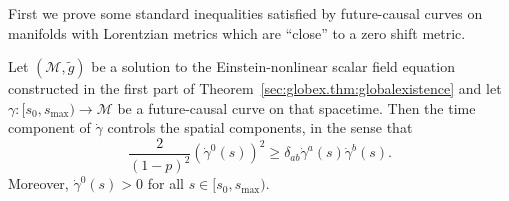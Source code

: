 \documentclass{article}
\newcommand{\mc}{\mathcal}
\newcommand{\wt}{\widetilde}
\newcommand{\ra}{\rightarrow}
\begin{document}
First we prove some standard inequalities satisfied by future-causal curves on manifolds with Lorentzian metrics which are ``close'' to a zero shift metric.
\begin{lemma}\label{sec:completethm.lem:causalbounds}
    Let $(\mc{M},\wt{g})$ be a solution to the Einstein-nonlinear scalar field equation constructed in the first part of Theorem~\ref{sec:globex.thm:globalexistence} and let $\gamma:[s_0,s_{\max}) \ra \mc{M}$ be a future-causal curve on that spacetime. Then the time component of $\dot{\gamma}$ controls the spatial components, in the sense that
    \begin{equation}\label{sec:completethm.eq:causalbounds}
        \frac{2}{(1-p)^2}(\dot{\gamma}^0(s))^2 \geq \delta_{ab} \dot{\gamma}^a(s) \dot{\gamma}^b(s).
    \end{equation}
    Moreover, $\dot{\gamma}^0(s) > 0$ for all $s \in [s_0,s_{\max})$.
\end{lemma}
\end{document}
